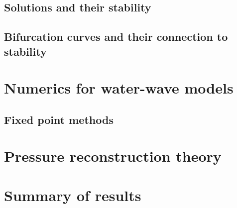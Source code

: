 \section{Solutions and their stability}




\section{Bifurcation curves and their connection to stability}



\chapter{Numerics for water-wave models}



\section{Fixed point methods}



\chapter{Pressure reconstruction theory}






\chapter{Summary of results}





